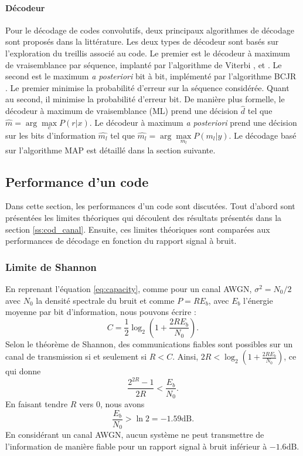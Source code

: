 \paragraph*{Décodeur}
Pour le décodage de codes convolutifs, deux principaux algorithmes de décodage sont proposés dans la littérature. Les 
deux types de décodeur sont basés sur l'exploration du treillis associé au code. Le premier est le décodeur à maximum de 
vraisemblance par séquence, implanté par l'algorithme de Viterbi \cite{viterbi}, \cite{viterbi2} et \cite{forney73viterbi}. 
Le second est le maximum {\it a posteriori} bit à bit, implémenté par l'algorithme BCJR \cite{bcjr}. Le premier 
minimise la probabilité d'erreur sur la séquence considérée.
Quant au second, il minimise la probabilité d'erreur bit. De 
manière plus formelle, le décodeur à maximum de vraisemblance (ML) prend une décision $\hat{d}$ tel que $\hat{m} = 
\arg\max\limits_c P(r|x)$. Le décodeur à maximum {\it a posteriori} prend une décision sur les bits d'information 
$\hat{m_l}$ tel que $\hat{m_l} = \arg\max\limits_{m_l} P(m_l|y)$. Le décodage basé sur l'algorithme MAP est détaillé 
dans la section suivante.


\subsection{Performance d'un code}
Dans cette section, les performances d'un code sont discutées. Tout d'abord sont présentées les limites théoriques qui 
découlent des résultats présentés dans la section \ref{ss:cod_canal}. Ensuite, ces limites théoriques sont comparées aux 
performances de décodage en fonction du rapport signal à bruit.
\subsubsection{Limite de Shannon}
En reprenant l'équation \ref{eq:capacity}, comme pour un canal AWGN, $\sigma^2 = N_0/2$ avec $N_0$ la densité spectrale du bruit et comme 
$P=R E_b$, avec $E_b$ l'énergie moyenne par bit d'information, nous pouvons écrire :
\[C=\frac{1}{2}\log_2(1+\frac{2RE_b}{N_0}).\]
Selon le théorème de Shannon, des communications fiables sont possibles sur un canal de transmission si et seulement si $R < C$. Ainsi,
$2R < \log_2\left(1+\frac{2RE_b}{N_0}\right)$, ce qui donne 
\begin{equation}\label{eq:shlimit}
	\frac{2^{2R}-1}{2R}<\frac{E_b}{N_0}.
\end{equation}
En faisant tendre $R$ vers $0$, nous avons \[\frac{E_b}{N_0}>\ln 2 = -1.59 \text{dB}.\]
En considérant un canal AWGN, aucun système ne peut transmettre de l'information de manière fiable pour un rapport 
signal à bruit inférieur à $-1.6\text{dB}.$

